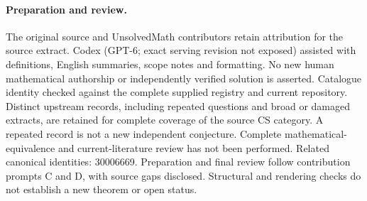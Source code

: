 \documentclass[11pt]{article}
\begin{document}
\paragraph{Preparation and review.}
The original source and UnsolvedMath contributors retain attribution for the source extract. Codex (GPT-6; exact serving revision not exposed) assisted with definitions, English summaries, scope notes and formatting. No new human mathematical authorship or independently verified solution is asserted. Catalogue identity checked against the complete supplied registry and current repository. Distinct upstream records, including repeated questions and broad or damaged extracts, are retained for complete coverage of the source CS category. A repeated record is not a new independent conjecture. Complete mathematical-equivalence and current-literature review has not been performed. Related canonical identities: 30006669. Preparation and final review follow contribution prompts C and D, with source gaps disclosed. Structural and rendering checks do not establish a new theorem or open status.
\label{end:statement}
\end{document}

